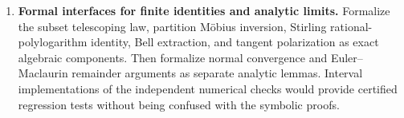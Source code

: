 \begin{enumerate}[leftmargin=*,label=\textbf{Q\arabic*.},itemsep=8pt]
\item \textbf{Formal interfaces for finite identities and analytic limits.}
Formalize the subset telescoping law, partition M\"obius inversion,
Stirling rational-polylogarithm identity, Bell extraction, and tangent
polarization as exact algebraic components. Then formalize normal
convergence and Euler--Maclaurin remainder arguments as separate
analytic lemmas. Interval implementations of the independent numerical
checks would provide certified regression tests without being confused
with the symbolic proofs.
\end{enumerate}

